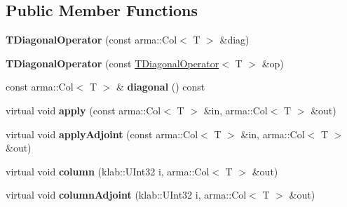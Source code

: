\subsection*{Public Member Functions}
\begin{DoxyCompactItemize}
\item 
{\bfseries T\+Diagonal\+Operator} (const arma\+::\+Col$<$ T $>$ \&diag)\hypertarget{classkl1p_1_1TDiagonalOperator_a32e10d270d886d141e27b9df68a4123b}{}\label{classkl1p_1_1TDiagonalOperator_a32e10d270d886d141e27b9df68a4123b}

\item 
{\bfseries T\+Diagonal\+Operator} (const \hyperlink{classkl1p_1_1TDiagonalOperator}{T\+Diagonal\+Operator}$<$ T $>$ \&op)\hypertarget{classkl1p_1_1TDiagonalOperator_a8a3a51ed8ebb2e9084c9a6dd64f79832}{}\label{classkl1p_1_1TDiagonalOperator_a8a3a51ed8ebb2e9084c9a6dd64f79832}

\item 
const arma\+::\+Col$<$ T $>$ \& {\bfseries diagonal} () const \hypertarget{classkl1p_1_1TDiagonalOperator_a8d09ade0b6cea483b619964501c4eaf9}{}\label{classkl1p_1_1TDiagonalOperator_a8d09ade0b6cea483b619964501c4eaf9}

\item 
virtual void {\bfseries apply} (const arma\+::\+Col$<$ T $>$ \&in, arma\+::\+Col$<$ T $>$ \&out)\hypertarget{classkl1p_1_1TDiagonalOperator_aaf78537f9261a1f83fe9942efd2c7fe6}{}\label{classkl1p_1_1TDiagonalOperator_aaf78537f9261a1f83fe9942efd2c7fe6}

\item 
virtual void {\bfseries apply\+Adjoint} (const arma\+::\+Col$<$ T $>$ \&in, arma\+::\+Col$<$ T $>$ \&out)\hypertarget{classkl1p_1_1TDiagonalOperator_a8feb065f8e6f33bfed73a2ae4650f99b}{}\label{classkl1p_1_1TDiagonalOperator_a8feb065f8e6f33bfed73a2ae4650f99b}

\item 
virtual void {\bfseries column} (klab\+::\+U\+Int32 i, arma\+::\+Col$<$ T $>$ \&out)\hypertarget{classkl1p_1_1TDiagonalOperator_a5b79269e3f345fc737023d057c3f4b51}{}\label{classkl1p_1_1TDiagonalOperator_a5b79269e3f345fc737023d057c3f4b51}

\item 
virtual void {\bfseries column\+Adjoint} (klab\+::\+U\+Int32 i, arma\+::\+Col$<$ T $>$ \&out)\hypertarget{classkl1p_1_1TDiagonalOperator_aa30fa6b336e7f44be6eafc1750759c4f}{}\label{classkl1p_1_1TDiagonalOperator_aa30fa6b336e7f44be6eafc1750759c4f}

\end{DoxyCompactItemize}
